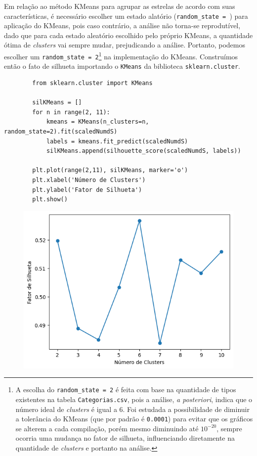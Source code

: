 

Em relação ao método KMeans para agrupar as estrelas de acordo com suas características, é necessário escolher um estado alatório (\verb|random_state = |) para aplicação do KMeans, pois caso contrário, a análise não torna-se reprodutível, dado que para cada estado aleatório escolhido pelo próprio KMeans, a quantidade ótima de \textit{clusters} vai sempre mudar, prejudicando a análise. Portanto, podemos escolher um \verb|random_state = 2|\footnote{A escolha do \texttt{random\_state = 2} é feita com base na quantidade de tipos existentes na tabela \texttt{Categorias.csv}, pois a análise, \textit{a posteriori}, indica que o número ideal de \textit{clusters} é igual a 6. Foi estudada a possibilidade de diminuir a tolerância do KMeans (que por padrão é \texttt{0.0001}) para evitar que os gráficos se alterem a cada compilação, porém mesmo diminuindo até $10^{-20}$, sempre ocorria uma mudança no fator de silhueta, influenciando diretamente na quantidade de \textit{clusters} e portanto na análise.} na implementação do KMeans. Construímos então o fato de silhueta importando o \verb|KMeans| da biblioteca \verb|sklearn.cluster|.
\begin{longlisting}
    \begin{verbatim}
        from sklearn.cluster import KMeans
        
        silKMeans = []
        for n in range(2, 11):
            kmeans = KMeans(n_clusters=n, random_state=2).fit(scaledNumdS)
            labels = kmeans.fit_predict(scaledNumdS)
            silKMeans.append(silhouette_score(scaledNumdS, labels))
        
        plt.plot(range(2,11), silKMeans, marker='o')
        plt.xlabel('Número de Clusters')
        plt.ylabel('Fator de Silhueta')
        plt.show()
    \end{verbatim}
\end{longlisting}
\begin{figure}[H]
    \centering
    \includegraphics[width=0.5\linewidth]{figures/KMeansSilhouette.png}
\end{figure}

